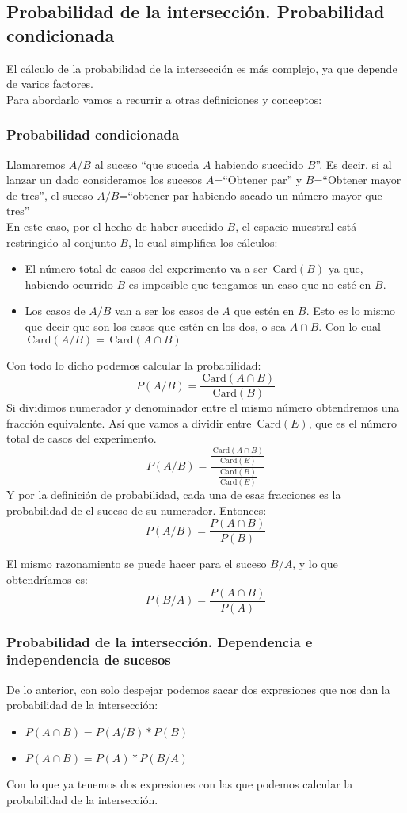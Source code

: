 \documentclass[a4paper,10pt,answers]{exam}
\newcommand\ddfrac[2]{\frac{\displaystyle #1}{\displaystyle #2}}
\newcommand{\Card}{\,\mathrm{Card}}
\begin{document}
\subsection{Probabilidad de la intersección. Probabilidad condicionada}
El cálculo de la probabilidad de la intersección es más complejo, ya que depende de varios factores.\\

Para abordarlo vamos a recurrir a otras definiciones y conceptos:
\subsubsection{Probabilidad condicionada}
Llamaremos $A/B$ al suceso ``que suceda $A$ habiendo sucedido $B$''. Es decir, si al lanzar un dado consideramos los sucesos $A$=``Obtener par'' y $B$=``Obtener mayor de tres'', el suceso $A/B$=``obtener par habiendo sacado un número mayor que tres''\\
En este caso, por el hecho de haber sucedido $B$, el espacio muestral está restringido al conjunto $B$, lo cual simplifica los cálculos:
\begin{itemize}
	\item El número total de casos del experimento va a ser $\Card(B)$ ya que, habiendo ocurrido $B$ es imposible que tengamos un caso que no esté en $B$.
	\item Los casos de $A/B$ van a ser los casos de $A$ que estén en $B$. Esto es lo mismo que decir que son los casos que estén en los dos, o sea $A \cap B$. Con lo cual $\Card(A/B) = \Card(A \cap B)$
\end{itemize}
Con todo lo dicho podemos calcular la probabilidad:
\[
P (A/B) = \frac{\Card(A \cap B)}{\Card(B)}
\]
Si dividimos numerador y denominador entre el mismo número obtendremos una fracción equivalente. Así que vamos a dividir entre $\Card(E)$, que es el número total de casos del experimento.
\[P(A/B) = \ddfrac{\frac{\Card(A \cap B)}{\Card(E)}}{\frac{\Card(B)}{\Card(E)}} \]
Y por la definición de probabilidad, cada una de esas fracciones es la probabilidad de el suceso de su numerador. Entonces:
\[P(A/B) = \frac{P(A \cap B)}{P(B)}\]

El mismo razonamiento se puede hacer para el suceso $B/A$, y lo que obtendríamos es:
\[P(B/A) = \frac{P(A \cap B)}{P(A)}\]

\subsubsection{Probabilidad de la intersección. Dependencia e independencia de sucesos}
De lo anterior, con solo despejar podemos sacar dos expresiones que nos dan la probabilidad de la intersección:
\begin{itemize}
	\item $P(A \cap B) = P(A/B) * P(B)$
	\item $P(A \cap B) = P(A) * P(B/A)$
\end{itemize}
Con lo que ya tenemos dos expresiones con las que podemos calcular la probabilidad de la intersección.\\
\end{document}

